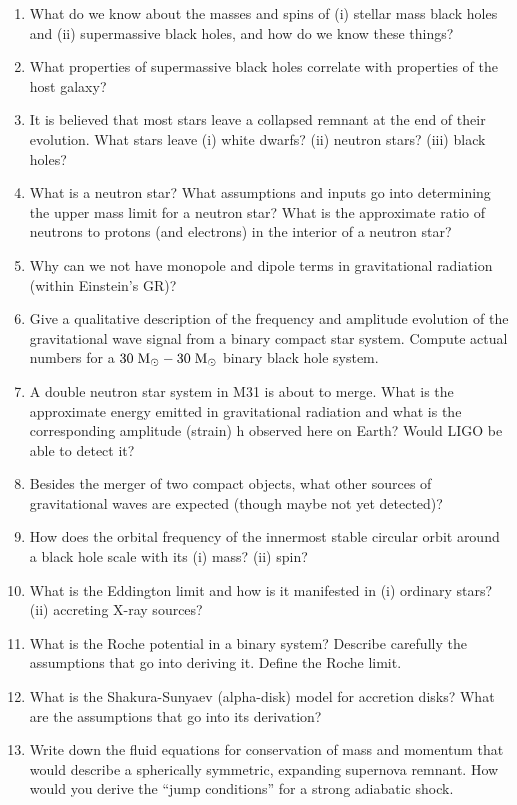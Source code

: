 \documentclass[10pt, oneside]{book}
\begin{document}
\begin{enumerate}[start=38]
    \item What do we know about the masses and spins of (i) stellar mass black holes and (ii) supermassive black holes, and how do we know these things?
    \item What properties of supermassive black holes correlate with properties of the host galaxy?
    \item It is believed that most stars leave a collapsed remnant at the end of their evolution. What stars leave (i) white dwarfs? (ii) neutron stars? (iii) black holes?
    \item What is a neutron star? What assumptions and inputs go into determining the upper mass limit for a neutron star? What is the approximate ratio of neutrons to protons (and electrons) in the interior of a neutron star?
    \item Why can we not have monopole and dipole terms in gravitational radiation (within Einstein's GR)?
    \item Give a qualitative description of the frequency and amplitude evolution of the gravitational wave signal from a binary compact star system. Compute actual numbers for a $30 \; {\rm M_{\odot}} - 30 \; {\rm M_{\odot}}$ binary black hole system.
    \item A double neutron star system in M31 is about to merge. What is the approximate energy emitted in gravitational radiation and what is the corresponding amplitude (strain) h observed here on Earth? Would LIGO be able to detect it?
    \item Besides the merger of two compact objects, what other sources of gravitational waves are expected (though maybe not yet detected)?
    \item How does the orbital frequency of the innermost stable circular orbit around a black hole scale with its (i) mass? (ii) spin?
    \item What is the Eddington limit and how is it manifested in (i) ordinary stars? (ii) accreting X-ray sources?
    \item What is the Roche potential in a binary system? Describe carefully the assumptions that go into deriving it. Define the Roche limit.
    \item What is the Shakura-Sunyaev (alpha-disk) model for accretion disks? What are the assumptions that go into its derivation?
    \item Write down the fluid equations for conservation of mass and momentum that would describe a spherically symmetric, expanding supernova remnant. How would you derive the ``jump conditions'' for a strong adiabatic shock.

\end{enumerate}
\end{document}

